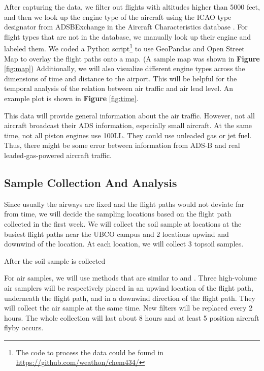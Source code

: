 \documentclass[12pt]{article}
\begin{document}
After capturing the data, we filter out flights with altitudes higher than 5000 feet, and then we look up the engine type of the aircraft using the ICAO type designator from ADSBExchange in the Aircraft Characteristics database \cite{faa}. For flight types that are not in the database, we manually look up their engine and labeled them. We coded a Python script\footnote{The code to process the data could be found in \url{https://github.com/weathon/chem434/}} to use GeoPandas and Open Street Map \cite{OpenStreetMap} to overlay the flight paths onto a map. (A sample map was shown in \textbf{Figure} \ref{fig:map}) Additionally, we will also visualize different engine types across the dimensions of time and distance to the airport. This will be helpful for the temporal analysis of the relation between air traffic and air lead level. An example plot is shown in \textbf{Figure} \ref{fig:time}.


This data will provide general information about the air traffic. However, not all aircraft broadcast their ADS information, especially small aircraft. At the same time, not all piston engines use 100LL. They could use unleaded gas or jet fuel. Thus, there might be some error between information from ADS-B and real leaded-gas-powered aircraft traffic. 

\subsection{Sample Collection And Analysis}
Since usually the airways are fixed and the flight paths would not deviate far from time, we will decide the sampling locations based on the flight path collected in the first week. We will collect the soil sample at locations at the busiest flight paths near the UBCO campus and 2 locations upwind and downwind of the location. At each location, we will collect 3 topsoil samples.  

After the soil sample is collected


For air samples, we will use methods that are similar to \cite{gharaibeh_determination_2010} and \cite{vijayanand_assessment_2008}. Three high-volume air samplers will be respectively placed in an upwind location of the flight path, underneath the flight path, and in a downwind direction of the flight path. They will collect the air sample at the same time. New filters will be replaced every 2 hours. The whole collection will last about 8 hours and at least 5 position aircraft flyby occurs. 
\end{document}
